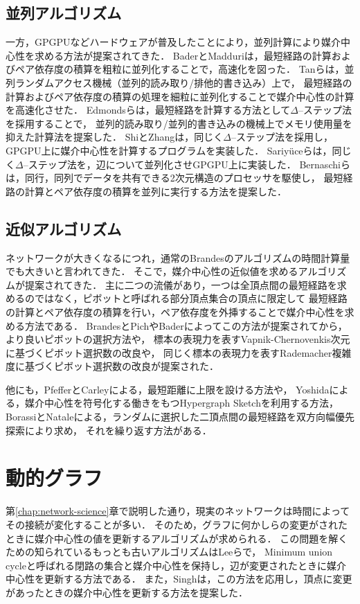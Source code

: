 \subsection{並列アルゴリズム}
一方，GPGPUなどハードウェアが普及したことにより，並列計算により媒介中心性を求める方法が提案されてきた．
BaderとMadduri\cite{Bader2006}は，最短経路の計算およびペア依存度の積算を粗粒に並列化することで，高速化を図った．
Tanら\cite{Tan2009}は，並列ランダムアクセス機械（並列的読み取り/排他的書き込み）上で，
最短経路の計算およびペア依存度の積算の処理を細粒に並列化することで媒介中心性の計算を高速化させた．
Edmondsら\cite{Edmonds2010}は，最短経路を計算する方法として$\Delta$--ステップ法を採用することで，
並列的読み取り/並列的書き込みの機械上でメモリ使用量を抑えた計算法を提案した．
ShiとZhang\cite{Shi2011}は，同じく$\Delta$--ステップ法を採用し，GPGPU上に媒介中心性を計算するプログラムを実装した．
Sariy{\"{u}}ceら\cite{Sariyuce2013}は，同じく$\Delta$--ステップ法を，辺について並列化させGPGPU上に実装した．
Bernaschiら\cite{Bernaschi2016}は，同行，同列でデータを共有できる2次元構造のプロセッサを駆使し，
最短経路の計算とペア依存度の積算を並列に実行する方法を提案した．

\subsection{近似アルゴリズム}
ネットワークが大きくなるにつれ，通常のBrandesのアルゴリズムの時間計算量でも大きいと言われてきた．
そこで，媒介中心性の近似値を求めるアルゴリズムが提案されてきた．
主に二つの流儀があり，一つは全頂点間の最短経路を求めるのではなく，ピボットと呼ばれる部分頂点集合の頂点に限定して
最短経路の計算とペア依存度の積算を行い，ペア依存度を外挿することで媒介中心性を求める方法である\cite{Brandes2007}．
BrandesとPich\cite{Brandes2007}やBader\cite{Bader2007}によってこの方法が提案されてから，
より良いピボットの選択方法\cite{Geisberger2008,Chehreghani2014}や，
標本の表現力を表すVapnik-Chernovenkis次元に基づくピボット選択数の改良\cite{Riondato2014}や，
同じく標本の表現力を表すRademacher複雑度に基づくピボット選択数の改良\cite{Riondato2016}が提案された．

他にも，PfefferとCarleyによる，最短距離に上限を設ける方法\cite{Pfeffer2012}や，
Yoshidaによる，媒介中心性を符号化する働きをもつHypergraph Sketchを利用する方法\cite{Yoshida2014}，
BorassiとNataleによる，ランダムに選択した二頂点間の最短経路を双方向幅優先探索により求め，
それを繰り返す方法\cite{Borassi2019}がある．

\section{動的グラフ}
第\ref{chap:network-science}章で説明した通り，現実のネットワークは時間によってその接続が変化することが多い．
そのため，グラフに何かしらの変更がされたときに媒介中心性の値を更新するアルゴリズムが求められる．
この問題を解くための知られているもっとも古いアルゴリズムはLeeら\cite{Lee2012}で，
Minimum union cycleと呼ばれる閉路の集合と媒介中心性を保持し，辺が変更されたときに媒介中心性を更新する方法である．
また，Singh\cite{Singh2015}は，この方法を応用し，頂点に変更があったときの媒介中心性を更新する方法を提案した．

